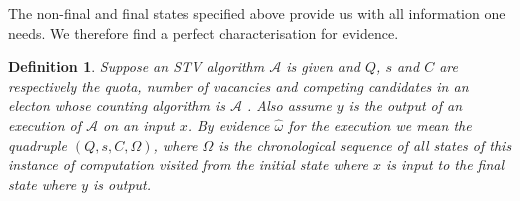 \documentclass[10pt,conference]{IEEEtran}
\newtheorem{definition}{Definition}
\begin{document}
The non-final and final states specified above provide us with all information one needs. We therefore find a perfect characterisation for evidence. 
\begin{definition}\label{formalEv}
Suppose an STV algorithm $\mathcal{A}$ is given and $Q$, $s$ and $C$ are respectively the quota, number of vacancies and competing candidates in an electon whose counting algorithm is $\mathcal{A}$ . Also assume  $y$ is the output of an execution of $\mathcal{A}$ on an input $x$. By evidence $\hat{\omega}$ for the execution  we mean the quadruple $(Q,s,C,\Omega)$, where $\Omega$ is the chronological sequence of all states of this instance of computation visited from the initial state where $x$ is input to the final state where $y$ is output.   
\end{definition}
\end{document}
